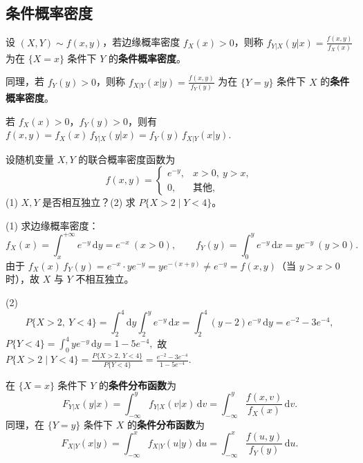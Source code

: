 \documentclass[lang=cn,11pt]{elegantbook}
\begin{document}
\subsection{条件概率密度}

\begin{definition}[条件概率密度] \label{def:conditional-pdf}
设 $(X,Y) \sim f(x,y)$，若边缘概率密度 $f_X(x) > 0$，则称
\(
f_{Y|X}(y|x) = \frac{f(x,y)}{f_X(x)}
\)
为在 $\{X = x\}$ 条件下 $Y$ 的\textbf{条件概率密度}。

同理，若 $f_Y(y) > 0$，则称
\(
f_{X|Y}(x|y) = \frac{f(x,y)}{f_Y(y)}
\)
为在 $\{Y = y\}$ 条件下 $X$ 的\textbf{条件概率密度}。
\end{definition}

\begin{property}[概率密度乘法公式]\label{prop:pdf-multiplication}
若 $f_X(x) > 0$，$f_Y(y) > 0$，则有
\(
f(x,y) = f_X(x)\,f_{Y|X}(y|x) = f_Y(y)\,f_{X|Y}(x|y).
\)
\end{property}


\begin{exercise}[判断独立性与条件概率] \label{exer:3-5d}
设随机变量 $X, Y$ 的联合概率密度函数为
\[
f(x,y) = \begin{cases} e^{-y}, & x > 0,\ y > x, \\ 0, & \text{其他}, \end{cases}
\]
(1) $X, Y$ 是否相互独立？(2) 求 $P\{X > 2 \mid Y < 4\}$。
\end{exercise}
\begin{solution}
(1) 求边缘概率密度：
\[
f_X(x) = \int_x^{+\infty} e^{-y}\,\mathrm{d}y = e^{-x}\ (x > 0), \qquad f_Y(y) = \int_0^y e^{-y}\,\mathrm{d}x = ye^{-y}\ (y > 0).
\]
由于 $f_X(x)\,f_Y(y) = e^{-x} \cdot ye^{-y} = ye^{-(x+y)} \neq e^{-y} = f(x,y)$（当 $y > x > 0$ 时），故 $X$ 与 $Y$ 不相互独立。

(2)
\[
P\{X > 2,\ Y < 4\} = \int_2^4\mathrm{d}y\int_2^y e^{-y}\,\mathrm{d}x = \int_2^4(y-2)e^{-y}\,\mathrm{d}y = e^{-2} - 3e^{-4},
\]
\(
P\{Y < 4\} = \int_0^4 ye^{-y}\,\mathrm{d}y = 1 - 5e^{-4},
\)
故
\(
P\{X > 2 \mid Y < 4\} = \frac{P\{X > 2,\ Y < 4\}}{P\{Y < 4\}} = \frac{e^{-2} - 3e^{-4}}{1 - 5e^{-4}}.
\)
\end{solution}


\begin{definition}[条件分布函数]\label{def:conditional-df} 
在 $\{X=x\}$ 条件下 $Y$ 的\textbf{条件分布函数}为
\[
F_{Y|X}(y|x) = \int_{-\infty}^{y}f_{Y|X}(v|x)\,\mathrm{d}v = \int_{-\infty}^{y}\frac{f(x,v)}{f_X(x)}\,\mathrm{d}v.
\]
同理，在 $\{Y=y\}$ 条件下 $X$ 的\textbf{条件分布函数}为
\[
F_{X|Y}(x|y) = \int_{-\infty}^{x}f_{X|Y}(u|y)\,\mathrm{d}u = \int_{-\infty}^{x}\frac{f(u,y)}{f_Y(y)}\,\mathrm{d}u.
\]
\end{definition}
\end{document}
